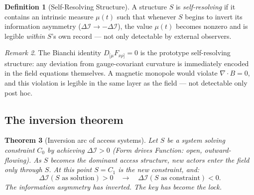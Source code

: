 \documentclass[11pt,a4paper]{article}
\theoremstyle{plain}
\newtheorem{theorem}{Theorem}[section]
\theoremstyle{definition}
\newtheorem{definition}[theorem]{Definition}
\theoremstyle{remark}
\newtheorem{remark}[theorem]{Remark}
\newcommand{\DI}{\Delta\mathcal{I}}
\begin{document}
\begin{definition}[Self-Resolving Structure]\label{def:self-resolving}
A structure $S$ is \emph{self-resolving} if it contains an intrinsic 
measure $\mu(t)$ such that whenever $S$ begins to invert its information 
asymmetry ($\DI \to -\DI$), the value $\mu(t)$ becomes nonzero and 
is legible \emph{within} $S$'s own record --- not only detectable by 
external observers.
\end{definition}

\begin{remark}
The Bianchi identity $D_{[\mu}F_{\nu\rho]} = 0$ is the prototype 
self-resolving structure: any deviation from gauge-covariant curvature 
is immediately encoded in the field equations themselves.  
A magnetic monopole would violate $\nabla \cdot B = 0$, and this 
violation is legible in the same layer as the field --- not 
detectable only post hoc.
\end{remark}

\subsection{The inversion theorem}

\begin{theorem}[Inversion arc of access systems]\label{thm:inversion}
Let $S$ be a system solving constraint $C_0$ by achieving $\DI > 0$ 
(Form drives Function: open, outward-flowing).  As $S$ becomes the 
dominant access structure, new actors enter the field only through $S$.  
At this point $S = C_1$ is the new constraint, and:
\begin{equation}
  \DI(S\text{ as solution}) > 0 \quad\longrightarrow\quad 
  \DI(S\text{ as constraint}) < 0.
\end{equation}
The information asymmetry has inverted.  The key has become the lock.
\end{theorem}
\end{document}
